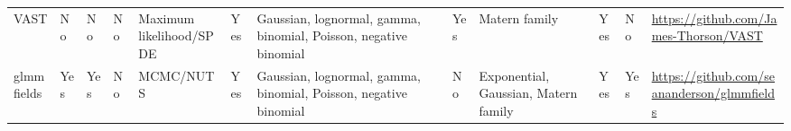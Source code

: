\documentclass[12pt,english]{article}
\begin{document}
\begin{landscape}
\begin{table}
\begin{minipage}{\textwidth}
\begin{scriptsize}
\begin{tabular}{llllL{2cm}lL{2.4cm}lL{2.0cm}llL{2.0cm}}
        VAST     & No             & No      & No      & Maximum likelihood/SPDE     & Yes        & Gaussian, lognormal, gamma, binomial, Poisson, negative binomial  & Yes      & Matern family                                     & Yes                   & No        & \url{https://github.com/James-Thorson/VAST}                      \\
        glmmfields & Yes            & Yes     & No      & MCMC/NUTS                   & Yes        & Gaussian, lognormal, gamma, binomial, Poisson, negative binomial  & No       & Exponential, Gaussian, Matern family              & Yes                   & Yes       & \url{https://github.com/seananderson/glmmfields}                  \\
        \bottomrule
      \end{tabular}
    \end{scriptsize}
  \end{minipage}
  \end{table}
\end{landscape}
\end{document}
